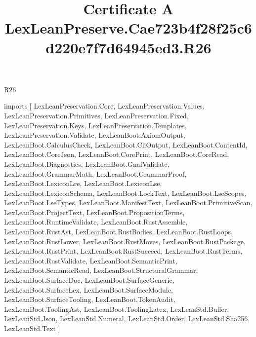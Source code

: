 \begin{lexlean}{R26}
\title{Certificate A LexLeanPreserve.Cae723b4f28f25c6d220e7f7d64945ed3.R26}
\begin{coremodule}
imports [
  LexLeanPreservation.Core,
  LexLeanPreservation.Values,
  LexLeanPreservation.Primitives,
  LexLeanPreservation.Fixed,
  LexLeanPreservation.Keys,
  LexLeanPreservation.Templates,
  LexLeanPreservation.Validate,
  LexLeanBoot.AxiomOutput,
  LexLeanBoot.CalculusCheck,
  LexLeanBoot.CliOutput,
  LexLeanBoot.ContentId,
  LexLeanBoot.CoreJson,
  LexLeanBoot.CorePrint,
  LexLeanBoot.CoreRead,
  LexLeanBoot.Diagnostics,
  LexLeanBoot.GnafValidate,
  LexLeanBoot.GrammarMath,
  LexLeanBoot.GrammarProof,
  LexLeanBoot.LexiconLre,
  LexLeanBoot.LexiconLse,
  LexLeanBoot.LexiconSchema,
  LexLeanBoot.LockText,
  LexLeanBoot.LseScopes,
  LexLeanBoot.LseTypes,
  LexLeanBoot.ManifestText,
  LexLeanBoot.PrimitiveScan,
  LexLeanBoot.ProjectText,
  LexLeanBoot.PropositionTerms,
  LexLeanBoot.RuntimeValidate,
  LexLeanBoot.RustAssemble,
  LexLeanBoot.RustAst,
  LexLeanBoot.RustBodies,
  LexLeanBoot.RustLoops,
  LexLeanBoot.RustLower,
  LexLeanBoot.RustMoves,
  LexLeanBoot.RustPackage,
  LexLeanBoot.RustPrint,
  LexLeanBoot.RustSucceed,
  LexLeanBoot.RustTerms,
  LexLeanBoot.RustValidate,
  LexLeanBoot.SemanticPrint,
  LexLeanBoot.SemanticRead,
  LexLeanBoot.StructuralGrammar,
  LexLeanBoot.SurfaceDoc,
  LexLeanBoot.SurfaceGeneric,
  LexLeanBoot.SurfaceLex,
  LexLeanBoot.SurfaceModule,
  LexLeanBoot.SurfaceTooling,
  LexLeanBoot.TokenAudit,
  LexLeanBoot.ToolingAst,
  LexLeanBoot.ToolingLatex,
  LexLeanStd.Buffer,
  LexLeanStd.Json,
  LexLeanStd.Numeral,
  LexLeanStd.Order,
  LexLeanStd.Sha256,
  LexLeanStd.Text
]


\end{coremodule}
\end{lexlean}
